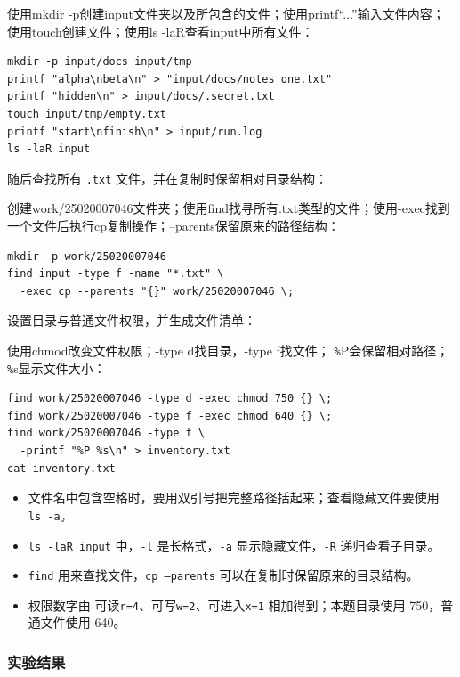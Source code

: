\documentclass[UTF8,a4paper,11pt]{ctexart}
\begin{document}
使用mkdir -p创建input文件夹以及所包含的文件；使用printf“...”输入文件内容；使用touch创建文件；使用ls -laR查看input中所有文件：

\begin{lstlisting}[style=terminal]
mkdir -p input/docs input/tmp
printf "alpha\nbeta\n" > "input/docs/notes one.txt"
printf "hidden\n" > input/docs/.secret.txt
touch input/tmp/empty.txt
printf "start\nfinish\n" > input/run.log
ls -laR input
\end{lstlisting}

随后查找所有 \texttt{.txt} 文件，并在复制时保留相对目录结构：

创建work/25020007046文件夹；使用find找寻所有.txt类型的文件；使用-exec找到一个文件后执行cp复制操作；--parents保留原来的路径结构：

\begin{lstlisting}[style=terminal]
mkdir -p work/25020007046
find input -type f -name "*.txt" \
  -exec cp --parents "{}" work/25020007046 \;
\end{lstlisting}

设置目录与普通文件权限，并生成文件清单：

使用chmod改变文件权限；-type d找目录，-type f找文件； \texttt{\%}P会保留相对路径；\texttt{\%}s显示文件大小：

\begin{lstlisting}[style=terminal]
find work/25020007046 -type d -exec chmod 750 {} \;
find work/25020007046 -type f -exec chmod 640 {} \;
find work/25020007046 -type f \
  -printf "%P %s\n" > inventory.txt
cat inventory.txt
\end{lstlisting}

\begin{itemize}[leftmargin=2em,itemsep=0.2em,topsep=0.3em]
  \small
  \item 文件名中包含空格时，要用双引号把完整路径括起来；查看隐藏文件要使用 \texttt{ls -a}。
  \item \texttt{ls -laR input} 中，\texttt{-l} 是长格式，\texttt{-a} 显示隐藏文件，\texttt{-R} 递归查看子目录。
  \item \texttt{find} 用来查找文件，\texttt{cp --parents} 可以在复制时保留原来的目录结构。
  \item 权限数字由 可读\texttt{r=4}、可写\texttt{w=2}、可进入\texttt{x=1} 相加得到；本题目录使用 750，普通文件使用 640。
\end{itemize}


\subsubsection{实验结果}
\end{document}
